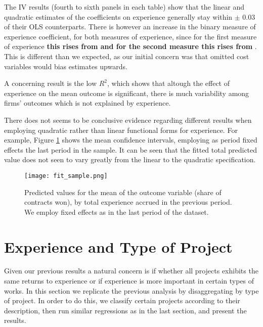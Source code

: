 The IV results (fourth to sixth panels in each table) show that  the linear and quadratic estimates of the coefficients on experience generally stay within $\pm$ 0.03 of their OLS counterparts. There is however an increase in the binary measure of experience coefficient, for both measures of experience, since for the first measure of experience \textbf{this rises from and for the second measure this rises from} . This is different than we expected, as our initial concern was that omitted cost variables would bias estimates upwards.

A concerning result is the low $R^2$, which shows that altough the effect of experience on the mean outcome is significant, there is much variability among firms' outcomes which is not explained by experience.





There does not seems to be conclusive evidence regarding different results when employing quadratic rather than linear functional forms for experience. For example, Figure \ref{fig:pred_average} shows the mean confidence intervals, employing as period fixed effects the last period in the sample. It can be seen that the fitted total predicted value does not seen to vary greatly from the linear to the quadratic specification.

\begin{figure}[H]
        \centering
        \texttt{[image: fit\_sample.png]}
        \caption{ \small Predicted values for the mean of the outcome variable (share of contracts won), by total experience accrued in the previous period. We employ fixed effects as in the last period of the dataset.}
        \label{fig:pred_average}
    \end{figure}




\section{Experience and Type of Project}
Given our previous results a natural concern is if whether all projects exhibits the same returns to experience or if experience is more important in certain types of works. In this section we replicate the previous analysis by disaggregating by type of project. In order to do this, we classify certain projects according to their description, then run similar regressions as in the last section, and present the results.

